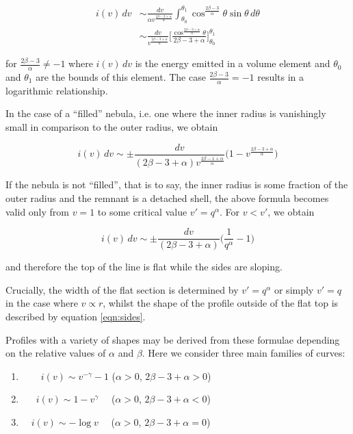 \begin{equation}
\begin{split}
i(v) \, dv &\sim \frac{dv}{\alpha v^{\frac{2\beta-3+\alpha}{\alpha}}} \int^{\theta_1}_{\theta_0} \cos^{\frac{2\beta-3}{\alpha}} \theta \sin \theta \, d\theta 
\\
&\sim  \frac{dv}{v^{\frac{2\beta-3+\alpha}{\alpha}}} \Bigg[\frac{\cos^{\frac{2\beta - 3 + \alpha}{\alpha}} \theta}{2\beta -3 + \alpha}\Bigg]^{\theta_1}_{\theta_0}
\end{split}
\end{equation}

\noindent for $\frac{2\beta-3}{\alpha} \neq -1$ where $i(v) \,dv$ is the energy emitted in a volume element and $\theta_0$ and $\theta_1$ are the bounds of this element.  The case 
$\frac{2\beta-3}{\alpha} = -1$ results in a logarithmic relationship.


In the case of a ``filled'' nebula, i.e. one where the inner radius is 
vanishingly small in comparison to the outer radius, we obtain

\begin{equation}
\label{eqn:sides}
	i(v) \, dv \sim \pm \frac{dv}{(2\beta-3+\alpha) v^{\frac{2\beta-1+\alpha}{\alpha}}} \Big(1-v^{\frac{2\beta-3+\alpha}{\alpha}} \Big)
\end{equation}

If the nebula is not ``filled'', that is to say, the inner radius is some 
fraction of the outer radius and the remnant is a detached shell, the 
above formula becomes valid only from $v=1$ to some critical value 
$v'=q^\alpha$. For $v<v'$, we obtain

\begin{equation}
i(v) \, dv \sim \pm \frac{dv}{(2\beta-3+\alpha)} \Big( \frac{1}{q^\alpha} - 1 \Big)
\end{equation}

\noindent and therefore the top of the line is flat while the sides are 
sloping.

Crucially, the width of the flat section is determined by $v'=q^\alpha$ or 
simply $v'=q$ in the case where $v \propto r$, whilst the shape of the 
profile outside of the flat top is described by equation \ref{eqn:sides}.

Profiles with a variety of shapes may be derived from these formulae 
depending on the relative values of $\alpha$ and $\beta$.  Here we 
consider three main families of curves:


\begin{enumerate}\parskip3pt

	\item \ \ $\quad i(v)  \sim v^{-\gamma}-1$ \quad ($\alpha>0$, $2\beta-3+\alpha>0$)
	\item \ $\quad i(v)  \sim 1-v^\gamma$ \quad \ \ ($\alpha>0$, $2\beta-3+\alpha<0$)
	\item  $\quad i(v) \sim -\log v$ \quad \ \ ($\alpha>0$, $2\beta-3+\alpha=0$)

\end{enumerate}


